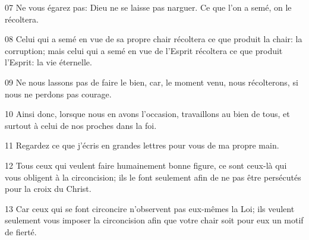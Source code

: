 07 Ne vous égarez pas: Dieu ne se laisse pas narguer. Ce que l’on a semé, on le récoltera.

08 Celui qui a semé en vue de sa propre chair récoltera ce que produit la chair: la corruption; mais celui qui a semé en vue de l’Esprit récoltera ce que produit l’Esprit: la vie éternelle.

09 Ne nous lassons pas de faire le bien, car, le moment venu, nous récolterons, si nous ne perdons pas courage.

10 Ainsi donc, lorsque nous en avons l’occasion, travaillons au bien de tous, et surtout à celui de nos proches dans la foi.

11 Regardez ce que j’écris en grandes lettres pour vous de ma propre main.

12 Tous ceux qui veulent faire humainement bonne figure, ce sont ceux-là qui vous obligent à la circoncision; ils le font seulement afin de ne pas être persécutés pour la croix du Christ.

13 Car ceux qui se font circoncire n’observent pas eux-mêmes la Loi; ils veulent seulement vous imposer la circoncision afin que votre chair soit pour eux un motif de fierté.
